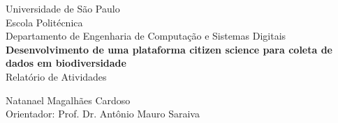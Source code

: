 \begin{titlepage}
  \begin{center}
    Universidade de São Paulo\\
    Escola Politécnica\\
    Departamento de Engenharia de Computação e Sistemas Digitais\\

    \vfill
    \large
    \textbf{Desenvolvimento de uma plataforma citizen science para coleta de dados em biodiversidade}\\
    \vspace{.6cm}
    Relatório de Atividades

    \vfill
    Natanael Magalhães Cardoso\\
    {\normalsize Orientador:} Prof. Dr. Antônio Mauro Saraiva
    \vspace{2cm}
  \end{center}
\end{titlepage}
